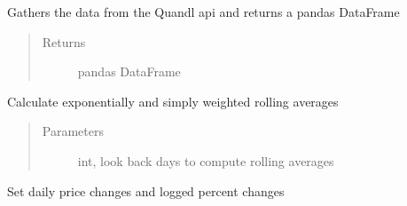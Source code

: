 \documentclass[letterpaper,10pt,english]{sphinxmanual}
\begin{document}
\begin{fulllineitems}

\begin{fulllineitems}
\label{\detokenize{market_data:risk_dash.market_data.QuandlStockData.gather}}
\sphinxAtStartPar
Gathers the data from the Quandl api and returns a pandas DataFrame
\begin{quote}\begin{description}
\item[{Returns}] \leavevmode
\sphinxAtStartPar
pandas DataFrame

\end{description}\end{quote}

\end{fulllineitems}


\begin{fulllineitems}
\label{\detokenize{market_data:risk_dash.market_data.QuandlStockData.set_expected}}
\sphinxAtStartPar
Calculate exponentially and simply weighted rolling averages
\begin{quote}\begin{description}
\item[{Parameters}] \leavevmode
\sphinxAtStartPar
{} \textendash{} int, look back days to compute rolling averages

\end{description}\end{quote}

\end{fulllineitems}


\begin{fulllineitems}
\label{\detokenize{market_data:risk_dash.market_data.QuandlStockData.set_price_changes}}
\sphinxAtStartPar
Set daily price changes and logged percent changes


\end{fulllineitems}
\end{fulllineitems}
\end{document}
